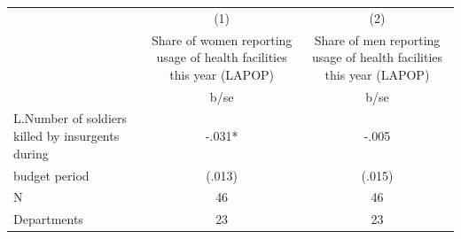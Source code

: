 {
\def\sym#1{\ifmmode^{#1}\else\(^{#1}\)\fi}
\begin{tabular}{l*{2}{c}}
\hline\hline
                                                  &\multicolumn{1}{c}{(1)}&\multicolumn{1}{c}{(2)}\\
                                                  &\multicolumn{1}{c}{Share of women reporting usage of health facilities this year (LAPOP)}&\multicolumn{1}{c}{Share of men reporting usage of health facilities this year (LAPOP)}\\
                                                  &        b/se   &        b/se   \\
\hline
L.Number of soldiers killed by insurgents during  &       -.031*  &       -.005   \\
budget period                                     &      (.013)   &      (.015)   \\
\hline
N                                                 &          46   &          46   \\
Departments                                       &          23   &          23   \\
\hline\hline
\end{tabular}
}
